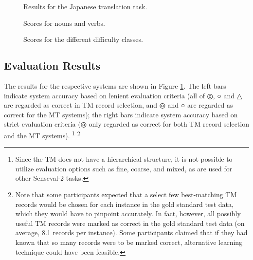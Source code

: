 \begin{figure}[htbp]
\begin{center}
  
 \caption{Results for the Japanese translation task.}
 \label{fig:trans_result}
\end{center}
\end{figure}

\begin{figure}[htbp]
\begin{center}
 
 \caption{Scores for nouns and verbs.}
 \label{fig:trans_resultNV}
\end{center}
\end{figure}

\begin{figure}[htbp]
\begin{center}
 \caption{Scores for the different difficulty classes.}
 \label{fig:trans_resultABC}
\end{center}
\end{figure}

\subsection{Evaluation Results}

The results for the respective systems are shown in Figure
\ref{fig:trans_result}.  The left bars indicate system accuracy based on
lenient evaluation criteria (all of ◎, ○ and △ are regarded as
correct in TM record selection, and ◎  and ○  are regarded as correct
for the MT systems); the right bars indicate system accuracy based on
strict evaluation criteria (◎ only regarded as correct for both TM
record selection and the MT systems).  \footnote{ Since the TM does not
  have a hierarchical structure, it is not possible to utilize
  evaluation options such as fine, coarse, and mixed, as are used for
  other {\sc Senseval-2} tasks.}  
\footnote{ Note that some participants expected that a select few
  best-matching TM records would be chosen for each instance in the gold
  standard test data, which they would have to pinpoint accurately.  In
  fact, however, all possibly useful TM records were marked as correct
  in the gold standard test data (on average, 8.1 records per instance).
  Some participants claimed that if they had known that so many records
  were to be marked correct, alternative learning technique could have
  been feasible.}

